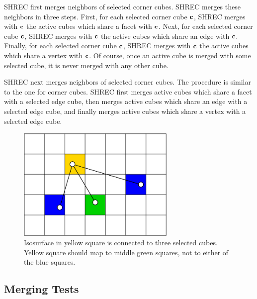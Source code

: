 SHREC first merges neighbors of selected corner cubes.
SHREC merges these neighbors in three steps.
First, for each selected corner cube $\mathbf{c}$,
SHREC merges with $\mathbf{c}$ the active cubes which share a facet with $\mathbf{c}$.
Next, for each selected corner cube $\mathbf{c}$,
SHREC merges with $\mathbf{c}$ the active cubes which share an edge with $\mathbf{c}$.
Finally, for each selected corner cube $\mathbf{c}$,
SHREC merges with $\mathbf{c}$ the active cubes which share a vertex with $\mathbf{c}$.
Of course, once an active cube is merged with some selected cube,
it is never merged with any other cube.

SHREC next merges neighbors of selected corner cubes.
The procedure is similar to the one for corner cubes.
SHREC first merges active cubes which share a facet with a selected edge cube,
then merges active cubes which share an edge with a selected edge cube,
and finally merges active cubes which share a vertex 
with a selected edge cube.


\begin{figure}[t]
\centering

\includegraphics[width=3in]{images/connectedToIII.eps}

\caption{Isosurface in yellow square is connected to three selected cubes.
Yellow square should map to middle green squares, 
not to either of the blue squares.}
\label{fig:connectedToIII}
\end{figure}

\subsection{Merging Tests}
\label{section:merging_tests}

